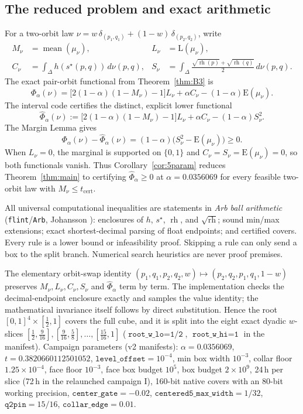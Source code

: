 \documentclass[11pt]{article}
\theoremstyle{plain}
\theoremstyle{definition}
\theoremstyle{remark}
\DeclareMathOperator{\mean}{mean}
\newcommand{\DD}{\Delta}
\newcommand{\rh}{\operatorname{rh}}
\newcommand{\sstar}{s^{\star}}
\newcommand{\Lb}{\mathrm{L}}
\newcommand{\Ee}{\mathrm{E}}
\begin{document}
\subsection{The reduced problem and exact arithmetic}
For a two-orbit law
\(\nu=w\,\delta_{(p_1,q_1)}+(1-w)\,\delta_{(p_2,q_2)}\), write
\[
\begin{aligned}
M_\nu&=\mean(\mu_\nu),&
L_\nu&=\Lb(\mu_\nu),\\
C_\nu&=\int_{\DD}h(\sstar(p,q))\,d\nu(p,q),&
S_\nu&=\int_{\DD}\frac{\sqrt{\rh(p)}+\sqrt{\rh(q)}}2\,d\nu(p,q).
\end{aligned}
\]
The exact pair-orbit functional from Theorem~\ref{thm:B3} is
\[
\Phi_\alpha(\nu)
=\bigl[2(1-\alpha)(1-M_\nu)-1\bigr]L_\nu
+\alpha C_\nu-(1-\alpha)\Ee(\mu_\nu).
\]
The interval code certifies the distinct, explicit lower functional
\begin{equation}
\widehat\Phi_\alpha(\nu)
:=\bigl[2(1-\alpha)(1-M_\nu)-1\bigr]L_\nu
+\alpha C_\nu-(1-\alpha)S_\nu^2.
\label{eq:relaxed-phi}
\end{equation}
The Margin Lemma gives
\[
\Phi_\alpha(\nu)-\widehat\Phi_\alpha(\nu)
=(1-\alpha)\bigl(S_\nu^2-\Ee(\mu_\nu)\bigr)\ge0.
\]
When \(L_\nu=0\), the marginal is supported on \(\{0,1\}\) and
\(C_\nu=S_\nu=\Ee(\mu_\nu)=0\), so both functionals vanish.  Thus
Corollary~\ref{cor:5param} reduces Theorem~\ref{thm:main} to certifying
\(\widehat\Phi_\alpha\ge0\) at \(\alpha=0.0356069\) for every feasible
two-orbit law with \(M_\nu\le t_{\mathrm{cert}}\).

All universal computational inequalities are statements in \emph{Arb ball
arithmetic} (\texttt{flint}/\texttt{Arb}, Johansson \cite{arb}): enclosures of
\(h\), \(\sstar\), \(\rh\), and \(\sqrt{\rh}\); sound min/max extensions;
exact shortest-decimal parsing of float endpoints; and certified covers.
Every rule is a lower bound or infeasibility proof.  Skipping a rule can only
send a box to the split branch.  Numerical search heuristics are never proof
premises.

The elementary orbit-swap identity
$(p_1,q_1,p_2,q_2,w)\mapsto(p_2,q_2,p_1,q_1,1-w)$ preserves
$M_\nu,L_\nu,C_\nu,S_\nu$ and \(\widehat\Phi_\alpha\) term by term.  The
implementation checks the decimal-endpoint enclosure exactly and samples the
value identity; the mathematical invariance itself follows by direct
substitution.  Hence the root
$[0,1]^4\times[\tfrac12,1]$ covers the full cube, and it is split into the
eight exact dyadic $w$-slices
$[\tfrac12,\tfrac9{16}],[\tfrac9{16},\tfrac58],\ldots,[\tfrac{15}{16},1]$
($\texttt{root\_w\_lo}=\texttt{1/2}$, $\texttt{root\_w\_hi}=\texttt{1}$
in the manifest). Campaign parameters (v2 manifests): $\alpha=0.0356069$,
$t=0.3820660112501052$, $\texttt{level\_offset}=10^{-4}$, min box width
$10^{-3}$, collar floor $1.25\times10^{-4}$, face floor $10^{-3}$, face box
budget $10^5$, box budget $2\times10^9$, 24\,h per slice (72\,h in the
relaunched campaign I), 160-bit native
covers with an 80-bit working precision, $\texttt{center\_gate}=-0.02$,
$\texttt{centered5\_max\_width}=1/32$, $\texttt{q2pin}=15/16$,
$\texttt{collar\_edge}=0.01$.
\end{document}
